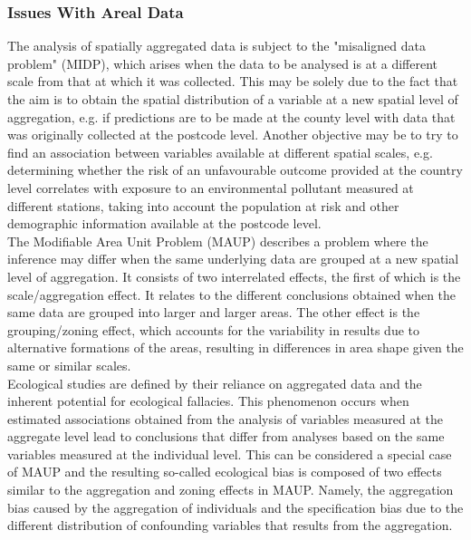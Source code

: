 \subsubsection{Issues With Areal Data}
The analysis of spatially aggregated data is subject to the "misaligned data problem" (MIDP), which arises when the data to be analysed is at a different scale from that at which it was collected. This may be solely due to the fact that the aim is to obtain the spatial distribution of a variable at a new spatial level of aggregation, e.g. if predictions are to be made at the county level with data that was originally collected at the postcode level. Another objective may be to try to find an association between variables available at different spatial scales, e.g. determining whether the risk of an unfavourable outcome provided at the country level correlates with exposure to an environmental pollutant measured at different stations, taking into account the population at risk and other demographic information available at the postcode level.\\
The Modifiable Area Unit Problem (MAUP) describes a problem where the inference may differ when the same underlying data are grouped at a new spatial level of aggregation. It consists of two interrelated effects, the first of which is the scale/aggregation effect. It relates to the different conclusions obtained when the same data are grouped into larger and larger areas. The other effect is the grouping/zoning effect, which accounts for the variability in results due to alternative formations of the areas, resulting in differences in area shape given the same or similar scales. \\
Ecological studies are defined by their reliance on aggregated data and the inherent potential for ecological fallacies. This phenomenon occurs when estimated associations obtained from the analysis of variables measured at the aggregate level lead to conclusions that differ from analyses based on the same variables measured at the individual level. This can be considered a special case of MAUP and the resulting so-called ecological bias is composed of two effects similar to the aggregation and zoning effects in MAUP. Namely, the aggregation bias caused by the aggregation of individuals and the specification bias due to the different distribution of confounding variables that results from the aggregation\autocite[Cf.][]{moraga2019geospatial}.
